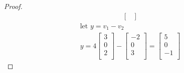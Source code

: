 \documentclass[12pt,a4paper]{article}
\begin{document}
\begin{proof}
\begin{align*}
\begin{bmatrix}
    \end{bmatrix}
  \end{align*}
  \begin{align*}
    \text{let } y=v_1-v_2\\
    y=  4\begin{bmatrix}
        3\\
        0\\
        2\\
    \end{bmatrix}
    -\begin{bmatrix}
      -2\\
      0\\
      3\\
    \end{bmatrix}
    =\begin{bmatrix}
      5\\
      0\\
      -1\\
    \end{bmatrix}
  \end{align*}
\end{proof}
\end{document}
